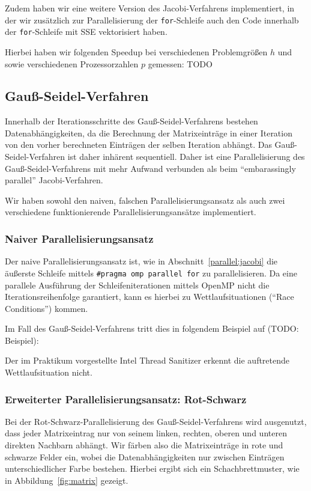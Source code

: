 \documentclass{article}
\begin{document}
Zudem haben wir eine weitere Version des Jacobi-Verfahrens implementiert, in der wir zusätzlich zur Parallelisierung der \texttt{for}-Schleife auch den Code innerhalb der \texttt{for}-Schleife mit SSE vektorisiert haben.

Hierbei haben wir folgenden Speedup bei verschiedenen Problemgrößen $h$ und sowie verschiedenen Prozessorzahlen $p$ gemessen: TODO

\subsection{Gauß-Seidel-Verfahren}

Innerhalb der Iterationsschritte des Gauß-Seidel-Verfahrens bestehen Datenabhängigkeiten, da die Berechnung der Matrixeinträge in einer Iteration von den vorher berechneten Einträgen der selben Iteration abhängt. Das Gauß-Seidel-Verfahren ist daher inhärent sequentiell. Daher ist eine Parallelisierung des Gauß-Seidel-Verfahrens mit mehr Aufwand verbunden als beim ``embarassingly parallel'' Jacobi-Verfahren.

Wir haben sowohl den naiven, falschen Parallelisierungsansatz als auch zwei verschiedene funktionierende Parallelisierungsansätze implementiert.

\subsubsection{Naiver Parallelisierungsansatz}\label{gs:naiv}
Der naive Parallelisierungsansatz ist, wie in Abschnitt~\ref{parallel:jacobi} die äußerste Schleife mittels \texttt{\#pragma omp parallel for} zu parallelisieren. Da eine parallele Ausführung der Schleifeniterationen mittels OpenMP nicht die Iterationsreihenfolge garantiert, kann es hierbei zu Wettlaufsituationen (``Race Conditions'') kommen.

Im Fall des Gauß-Seidel-Verfahrens tritt dies in folgendem Beispiel auf (TODO: Beispiel):


Der im Praktikum vorgestellte Intel Thread Sanitizer erkennt die auftretende Wettlaufsituation nicht.

\subsubsection{Erweiterter Parallelisierungsansatz: Rot-Schwarz}

Bei der Rot-Schwarz-Parallelisierung des Gauß-Seidel-Verfahrens wird ausgenutzt, dass jeder Matrixeintrag nur von seinem linken, rechten, oberen und unteren direkten Nachbarn abhängt. Wir färben also die Matrixeinträge in rote und schwarze Felder ein, wobei die Datenabhängigkeiten nur zwischen Einträgen unterschiedlicher Farbe bestehen. Hierbei ergibt sich ein Schachbrettmuster, wie in Abbildung~\ref{fig:matrix} gezeigt.
\end{document}
